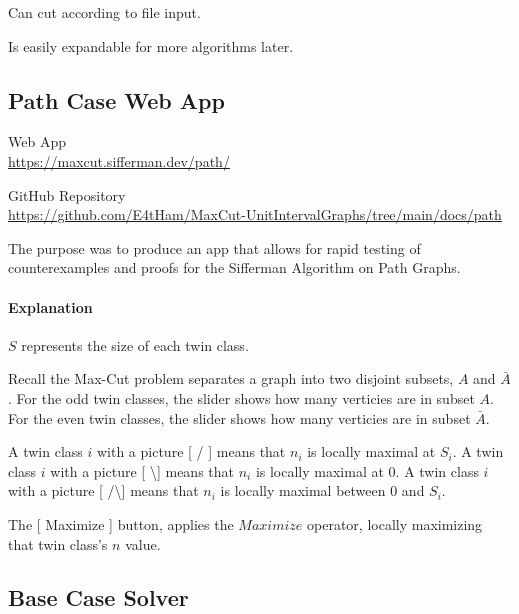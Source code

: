 \documentclass[12pt]{article}
\begin{document}
Can cut according to file input.

Is easily expandable for more algorithms later.


\pagebreak


\subsection{Path Case Web App}

\begin{center}
    Web App             \\
    \url{https://maxcut.sifferman.dev/path/}
\end{center}
\begin{center}
    GitHub Repository   \\
    \url{https://github.com/E4tHam/MaxCut-UnitIntervalGraphs/tree/main/docs/path}
\end{center}


The purpose was to produce an app that allows for rapid testing of counterexamples and proofs for the Sifferman Algorithm on Path Graphs.



\paragraph{Explanation} \leavevmode

$S$ represents the size of each twin class.

Recall the Max-Cut problem separates a graph into two disjoint subsets, $A$ and $\bar{A}$. For the odd twin classes, the slider shows how many verticies are in subset $A$. For the even twin classes, the slider shows how many verticies are in subset $\bar{A}$.

A twin class $i$ with a picture [ / ] means that $n_i$ is locally maximal at $S_i$. A twin class $i$ with a picture [ \textbackslash ] means that $n_i$ is locally maximal at $0$. A twin class $i$ with a picture [ /\textbackslash ] means that $n_i$ is locally maximal between $0$ and $S_i$.

The [ Maximize ] button, applies the $Maximize$ operator, locally maximizing that twin class's $n$ value.



\pagebreak


\subsection{Base Case Solver}
\end{document}
